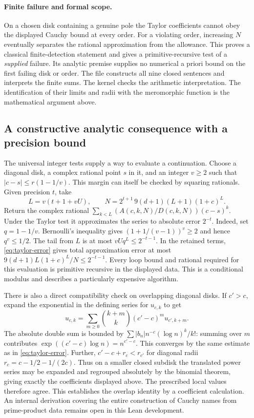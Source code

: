 \paragraph{Finite failure and formal scope.}
On a chosen disk containing a genuine pole the Taylor coefficients cannot obey the displayed Cauchy bound at every order. For a violating order, increasing $N$ eventually separates the rational approximation from the allowance. This proves a classical finite-detection statement and gives a primitive-recursive test of a \emph{supplied} failure. Its analytic premise supplies no numerical a priori bound on the first failing disk or order. The file  constructs all nine closed sentences and interprets the finite sums. The kernel checks the arithmetic interpretation. The identification of their limits and radii with the meromorphic function is the mathematical argument above.
\subsection*{A constructive analytic consequence with a precision bound}
The universal integer tests supply a way to evaluate a continuation. Choose a diagonal disk, a complex rational point $s$ in it, and an integer $v\ge2$ such that $|c-s|\le r(1-1/v)$. This margin can itself be checked by squaring rationals. Given precision $t$, take
\[
 L=v(t+1+vU),\qquad N=2^{t+1}\,9(d+1)(L+1)(1+c)^L .
\]
Return the complex rational $\sum_{k<L}(A(c,k,N)/D(c,k,N))(c-s)^k$. Under the Taylor test it approximates the series to absolute error $2^{-t}$. Indeed, set $q=1-1/v$. Bernoulli's inequality gives $(1+1/(v-1))^v\ge2$ and hence $q^v\le1/2$. The tail from $L$ is at most $vUq^L\le2^{-t-1}$. In the retained terms, \eqref{eq:taylor-error} gives total approximation error at most $9(d+1)L(1+c)^L/N\le2^{-t-1}$. Every loop bound and rational required for this evaluation is primitive recursive in the displayed data. This is a conditional modulus and describes a particularly expensive algorithm.

There is also a direct compatibility check on overlapping diagonal disks. If $c'>c$, expand the exponential in the defining series for $u_{c,k}$ to get
\[
  u_{c,k}=\sum_{m\ge0}\binom{k+m}{k}(c'-c)^m u_{c',k+m}.
\]
The absolute double sum is bounded by $\sum |b_n|n^{-c}(\log n)^k/k!$: summing over $m$ contributes $\exp((c'-c)\log n)=n^{c'-c}$. This converges by the same estimate as in \eqref{eq:taylor-error}. Further, $c'-c+r_c<r_{c'}$ for diagonal radii $r_c=c-1/2-1/(2c)$. Thus on a smaller closed subdisk the translated power series may be expanded and regrouped absolutely by the binomial theorem, giving exactly the coefficients displayed above. The prescribed local values therefore agree. This establishes the overlap identity by a coefficient calculation. An internal derivation covering the entire construction of Cauchy names from prime-product data remains open in this Lean development.

